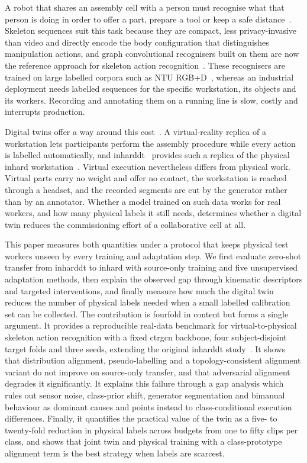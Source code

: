 \documentclass[Afour,sagev,times]{sagej}
\begin{document}
A robot that shares an assembly cell with a person must recognise what that
person is doing in order to offer a part, prepare a tool or keep a safe
distance~\cite{wang2018hrcmotion}. Skeleton sequences suit this task because
they are compact, less privacy-invasive than video and directly encode the body
configuration that distinguishes manipulation actions, and graph convolutional
recognisers built on them are now the reference approach for skeleton action
recognition~\cite{yan2018stgcn,chen2021ctrgcn,liu2025skeletonreview}. These
recognisers are trained on large labelled corpora such as NTU
RGB+D~\cite{shahroudy2016ntu,liu2020ntu120}, whereas an industrial deployment
needs labelled sequences for the specific workstation, its objects and its
workers. Recording and annotating them on a running line is slow, costly and
interrupts production.

Digital twins offer a way around this cost~\cite{tao2019digitaltwin}. A
virtual-reality replica of a workstation lets participants perform the assembly
procedure while every action is labelled automatically, and
\ac{inharddt}~\cite{dallel2023digital} provides such a replica of the physical
\ac{inhard} workstation~\cite{dallel2020inhardpaper}. Virtual execution
nevertheless differs from physical work. Virtual parts carry no weight and
offer no contact, the workstation is reached through a headset, and the
recorded segments are cut by the generator rather than by an annotator. Whether
a model trained on such data works for real workers, and how many physical
labels it still needs, determines whether a digital twin reduces the
commissioning effort of a collaborative cell at all.

This paper measures both quantities under a protocol that keeps physical test
workers unseen by every training and adaptation step. We first evaluate
zero-shot transfer from \ac{inharddt} to \ac{inhard} with source-only
training and five unsupervised adaptation methods, then explain the observed
gap through kinematic descriptors and targeted interventions, and finally
measure how much the digital twin reduces the number of physical labels needed
when a small labelled calibration set can be collected. The contribution is
fourfold in content but forms a single argument. It provides a reproducible
real-data benchmark for virtual-to-physical skeleton action recognition with a
fixed \ac{ctrgcn} backbone, four subject-disjoint target folds and three
seeds, extending the original \ac{inharddt} study~\cite{dallel2023digital}.
It shows that distribution alignment, pseudo-labelling and a
topology-consistent alignment variant do not improve on source-only transfer,
and that adversarial alignment degrades it significantly. It explains this
failure through a gap analysis which rules out sensor noise, class-prior shift,
generator segmentation and bimanual behaviour as dominant causes and points
instead to class-conditional execution differences. Finally, it quantifies the
practical value of the twin as a five- to twenty-fold reduction in physical
labels across budgets from one to fifty clips per class, and shows that joint
twin and physical training with a class-prototype alignment term is the best
strategy when labels are scarcest.
\end{document}

